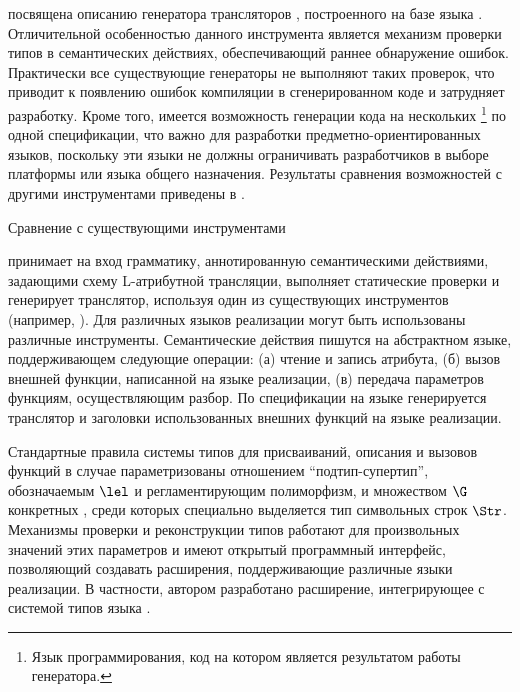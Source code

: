  посвящена описанию генератора трансляторов \ATF{}, построенного на базе языка \GRM{}. Отличительной особенностью данного инструмента является механизм проверки типов в семантических действиях, обеспечивающий раннее обнаружение ошибок. Практически все существующие генераторы не выполняют таких проверок, что приводит к появлению ошибок компиляции в сгенерированном коде и затрудняет разработку. Кроме того, имеется возможность генерации кода на нескольких \footnote{Язык программирования, код на котором является результатом работы генератора.} по одной спецификации, что важно для разработки предметно-ориентированных языков, поскольку эти языки не должны ограничивать разработчиков в выборе платформы или языка общего назначения. Результаты сравнения возможностей \ATF{} с другими инструментами приведены в . 

\begin{table}[htbp]
	\centering
\newcommand{\dissonly}[1]{}
	
	\caption{Сравнение \ATF{} с существующими инструментами}\label{AtfTable}
\end{table}

\ATF{} принимает на вход грамматику, аннотированную семантическими действиями, задающими схему L-атрибутной трансляции, выполняет статические проверки и генерирует транслятор, используя один из существующих инструментов (например, ). Для различных языков реализации могут быть использованы различные инструменты. Семантические действия пишутся на абстрактном языке, поддерживающем следующие операции: (а) чтение и запись атрибута, (б) вызов внешней функции, написанной на языке реализации, (в) передача параметров функциям, осуществляющим разбор. По спецификации на языке \ATF{} генерируется транслятор и заголовки использованных внешних функций на языке реализации.

Стандартные правила системы типов для присваиваний, описания и вызовов функций в случае \ATF{} параметризованы отношением ``подтип-супертип'', обозначаемым $\lel$ и регламентирующим полиморфизм, и множеством $\G$ конкретных , среди которых специально выделяется тип символьных строк $\Str$. Механизмы проверки и реконструкции типов работают для произвольных значений этих параметров и имеют открытый программный интерфейс, позволяющий создавать расширения, поддерживающие различные языки реализации. В частности, автором разработано расширение, интегрирующее \ATF{} с системой типов языка . 

